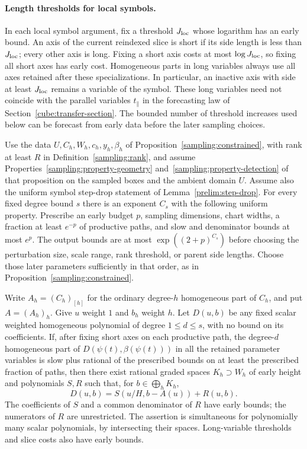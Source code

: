 \paragraph{Length thresholds for local symbols.}
In each local symbol argument, fix a threshold $J_{\rm loc}$ whose
logarithm has an early bound.  An axis of the current reindexed slice
is short if its side length is less than $J_{\rm loc}$; every other
axis is long.  Fixing a short axis costs at most $\log J_{\rm loc}$,
so fixing all short axes has early cost.  Homogeneous parts in long
variables always use all axes retained after these specializations.
In particular, an inactive axis with side at least $J_{\rm loc}$
remains a variable of the symbol.  These long variables need not
coincide with the parallel variables $t_\parallel$ in the forecasting
law of Section~\ref{cube:transfer-section}.
The bounded number of threshold increases used below can be
forecast from early data before the later sampling choices.

\begin{proposition}
\label{lifting:candidate-major}
Use the data $U,C_h,W_h,c_h,y_h,\beta_h$ of
Proposition~\ref{sampling:constrained}, with rank at least $R$ in
Definition~\ref{sampling:rank}, and assume
Properties~\ref{sampling:property-geometry} and~\ref{sampling:property-detection} of that
proposition on the sampled boxes and the ambient domain $U$.
Assume also the uniform symbol step-drop statement of
Lemma~\ref{prelim:step-drop}.
For every fixed degree bound $s$ there is an exponent $C_s$
with the following uniform property.  Prescribe an early budget $p$,
sampling dimensions, chart widths, a fraction at least $e^{-p}$ of
productive paths, and slow and denominator bounds at most $e^p$.
The output bounds are at most
$\exp((2+p)^{C_s})$ before choosing the perturbation size, scale
range, rank threshold, or parent side lengths.  Choose those later
parameters sufficiently in that order, as in
Proposition~\ref{sampling:constrained}.

Write $A_h=(C_h)_{[h]}$ for the ordinary degree-$h$ homogeneous part
of $C_h$, and put $A=(A_h)_h$.  Give $u$ weight $1$ and $b_h$ weight
$h$.  Let $D(u,b)$ be any fixed scalar weighted homogeneous polynomial
of degree $1\le d\le s$, with no bound on its coefficients.
If, after fixing short axes on each productive path, the degree-$d$
homogeneous part of $D(\psi(t),\beta(\psi(t)))$ in all the retained
parameter variables is slow plus rational of
the prescribed bounds on at least the prescribed fraction of paths,
then there exist rational graded spaces $K_h\supset W_h$ of
early height and polynomials $S,R$ such that, for $b\in\bigoplus_hK_h$,
\begin{equation}
 D(u,b)=S(u/H,b-A(u))+R(u,b).
 \label{lifting:major-form}
\end{equation}
The coefficients of $S$ and a common denominator of $R$ have early
bounds; the numerators of $R$ are unrestricted.  The assertion is simultaneous
for polynomially many scalar polynomials, by intersecting their
spaces.  Long-variable thresholds and slice costs also have
early bounds.

\end{proposition}

